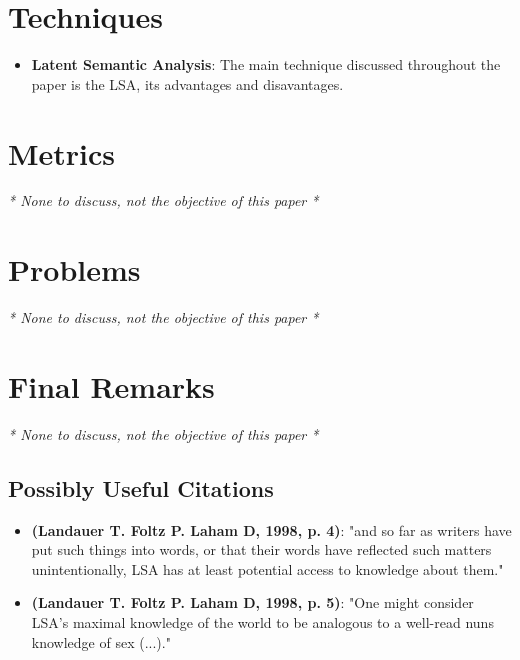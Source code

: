\documentclass{Paper_Summary}
\begin{document}
\section{Techniques}
    \begin{itemize}
        \item \textbf{Latent Semantic Analysis}: The main technique discussed throughout the paper is the LSA, its advantages and disavantages.
    \end{itemize}

\section{Metrics}
\emph{* None to discuss, not the objective of this paper *}

\section{Problems}
\emph{* None to discuss, not the objective of this paper *}


\section{Final Remarks}
\emph{* None to discuss, not the objective of this paper *}

\breakline

\begin{center}
    \section*{Possibly Useful Citations}
\end{center}

    \begin{itemize}
        \item \textbf{(Landauer T. Foltz P. Laham D, 1998, p. 4)}: "and so far as writers have put such things into words, or that their words have reflected such matters unintentionally, LSA has at least potential access to knowledge about them."
        \item \textbf{(Landauer T. Foltz P. Laham D, 1998, p. 5)}: "One might consider LSA's maximal knowledge of the world to be analogous to a well-read nuns knowledge of sex (...)."
    \end{itemize}
\end{document}
